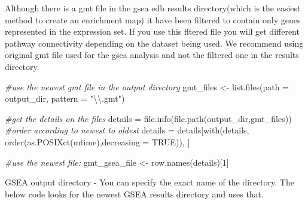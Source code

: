 \documentclass[
]{book}
\newenvironment{Shaded}{\begin{snugshade}}{\end{snugshade}}
\newcommand{\AttributeTok}[1]{\textcolor[rgb]{0.77,0.63,0.00}{#1}}
\newcommand{\CommentTok}[1]{\textcolor[rgb]{0.56,0.35,0.01}{\textit{#1}}}
\newcommand{\ConstantTok}[1]{\textcolor[rgb]{0.00,0.00,0.00}{#1}}
\newcommand{\DecValTok}[1]{\textcolor[rgb]{0.00,0.00,0.81}{#1}}
\newcommand{\FunctionTok}[1]{\textcolor[rgb]{0.00,0.00,0.00}{#1}}
\newcommand{\NormalTok}[1]{#1}
\newcommand{\OtherTok}[1]{\textcolor[rgb]{0.56,0.35,0.01}{#1}}
\newcommand{\SpecialCharTok}[1]{\textcolor[rgb]{0.00,0.00,0.00}{#1}}
\newcommand{\StringTok}[1]{\textcolor[rgb]{0.31,0.60,0.02}{#1}}
\begin{document}
Although there is a gmt file in the gsea edb results directory(which is the easiest method to create an enrichment map) it have been filtered to contain only genes represented in the expression set. If you use this fltered file you will get different pathway connectivity depending on the dataset being used. We recommend using original gmt file used for the gsea analysis and not the filtered one in the results directory.

\begin{Shaded}
\begin{Highlighting}[]
\CommentTok{\#use the newest gmt file in the output directory}
\NormalTok{gmt\_files }\OtherTok{\textless{}{-}} \FunctionTok{list.files}\NormalTok{(}\AttributeTok{path =}\NormalTok{ output\_dir, }\AttributeTok{pattern =} \StringTok{"}\SpecialCharTok{\textbackslash{}\textbackslash{}}\StringTok{.gmt"}\NormalTok{)}

  \CommentTok{\#get the details on the files}
\NormalTok{  details }\OtherTok{=} \FunctionTok{file.info}\NormalTok{(}\FunctionTok{file.path}\NormalTok{(output\_dir,gmt\_files))}
  \CommentTok{\#order according to newest to oldest}
\NormalTok{  details }\OtherTok{=}\NormalTok{ details[}\FunctionTok{with}\NormalTok{(details, }\FunctionTok{order}\NormalTok{(}\FunctionTok{as.POSIXct}\NormalTok{(mtime),}\AttributeTok{decreasing =} \ConstantTok{TRUE}\NormalTok{)), ]}

  \CommentTok{\#use the newest file:}
\NormalTok{ gmt\_gsea\_file }\OtherTok{\textless{}{-}} \FunctionTok{row.names}\NormalTok{(details)[}\DecValTok{1}\NormalTok{]}
\end{Highlighting}
\end{Shaded}

GSEA output directory - You can specify the exact name of the directory. The below code looks for the newest GSEA results directory and uses that.
\end{document}
